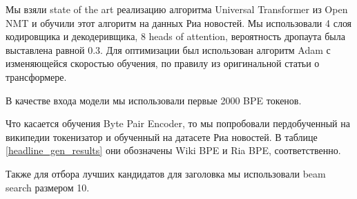 \documentclass[aps,%
12pt,%
final,%
oneside,
onecolumn,%
musixtex, %
superscriptaddress,%
centertags]{article} %
\begin{document}
Мы взяли state of the art реализацию алгоритма Universal Transformer из Open NMT \cite{2017opennmt} и обучили этот алгоритм на данных Риа новостей. Мы использовали 4 слоя кодировщика и декодеривщика, 8 heads of attention, вероятность дропаута была выставлена равной 0.3. Для оптимизации был использован алгоритм Adam с изменяющейся скоростью обучения, по правилу из оригинальной статьи о трансформере.

В качестве входа модели мы использовали первые 2000 BPE токенов.

Что касается обучения Byte Pair Encoder, то мы попробовали пердобученный на википедии токенизатор и обученный на датасете Риа новостей. В таблице \ref{headline_gen_results} они обозначены Wiki BPE и Ria BPE, соответственно.

Также для отбора лучших кандидатов для заголовка мы использовали beam search размером 10.
\end{document}
